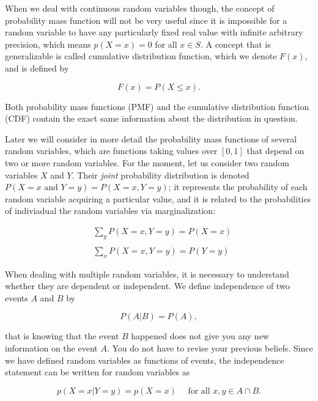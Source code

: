 \documentclass[12pt]{article}
\begin{document}
When we deal with continuous random variables though, the concept of probability mass function will 
not be very useful since it is impossible for a random variable to have any particularly fixed
real value with infinite arbitrary precision, which means $p(X = x) = 0$ for all $x \in S$.
A concept that is generalizable is called cumulative distribution function, which we denote $F(x)$, 
and is defined by

\begin{equation}
F(x) = P( X \leq x).
\end{equation}

\noindent
Both probability mass functions (PMF) and the cumulative distribution function (CDF)
contain the exact same information about the distribution in question.

Later we will consider in more detail the probability mass functions of several random variables,
which are functions taking values over $[0, 1]$  that depend on two or more random variables.
For the moment, let us consider two random variables $X$ and $Y$.
Their \textit{joint} probability distribution is denoted $P(X = x \text{ and } Y = y) = P(X = x, Y = y)$;
it represents the probability of each random variable acquiring a particular 
value, and it is related to the probabilities of indiviadual the random variables via marginalization:

\begin{subequations}
\begin{align}
&\sum_{y} P(X = x, Y = y) = P(X = x)
\\
\nonumber \\
&\sum_{x} P(X = x, Y = y) = P(Y = y)
\end{align}
\end{subequations}

When dealing with multiple random variables, it is 
necessary to understand whether they are dependent or 
independent.
We define independence of two events $A$ and $B$ by

\begin{equation}
P(A | B) = P(A),
\end{equation}

\noindent
that is knowing that the event $B$ happened does not give you any new information
on the event $A$. You do not have to revise your previous beliefs.
Since we have defined random variables as functions of events, the 
independence statement can be written for random variables as 

\begin{equation}
p(X = x | Y = y) = p(X = x) 
\quad
\mbox{ for all 	}
x, y \in A \cap B.
\end{equation}
\end{document}
